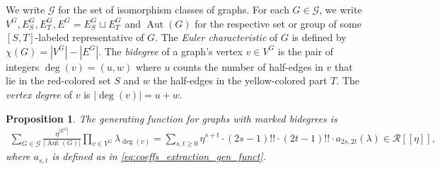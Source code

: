 \documentclass[english]{ourlematemasingle}
\numberwithin{theorem}{section}
\newtheorem{proposition}[theorem]{Proposition}
\theoremstyle{remark}
\newcommand{\colS}{red}
\newcommand{\colT}{yellow}
\newcommand{\GG}{\mathcal{G}}
\DeclareMathOperator{\Aut}{Aut}
\newcommand{\G}{\mathcal{G}}
\begin{document}
We write $\GG$ for the set of isomorphism classes of graphs. For each $G \in \GG$, we write $V^G,E_S^G,E_T^G,E^G=E_S^G\sqcup E_T^G$ and $\Aut(G)$ 
for the respective set or group of some $[S,T]$-labeled representative of $G$.
The \emph{Euler characteristic} of $G$ is defined by $\chi(G) = |V^G|-|E^G|$.
The \emph{bidegree} of a graph's vertex $v\in V^G$ is the pair of integers $\deg(v) = (u,w)$ where $u$ counts the number of half-edges in $v$ that lie in the \colS{}-colored set $S$ and $w$ the half-edges in the \colT{}-colored part $T$. The \emph{vertex degree} of $v$ is $|\deg(v)| = u+w$.

\begin{proposition}
\label{prop:genfun2colgraphs}
The generating function for graphs with marked bidegrees is
\begin{gather*}
        \sum_{G\in \G} \frac{\eta^{|E^G|} }{
\left\lvert \Aut(G) \right\rvert} 
\prod \limits _{v\in V^G}
\lambda_{\deg(v)}
= \sum_{s,t\geq 0} \eta^{s+t} \cdot  (2s-1)!!\cdot (2t-1)!!\cdot
a_{2s,2t}(\lambda) \in \mathcal R[[\eta]],
\end{gather*}
where $a_{s,t}$ is defined as in \eqref{eq:coeffs_extraction_gen_funct}.
\end{proposition}
\end{document}
